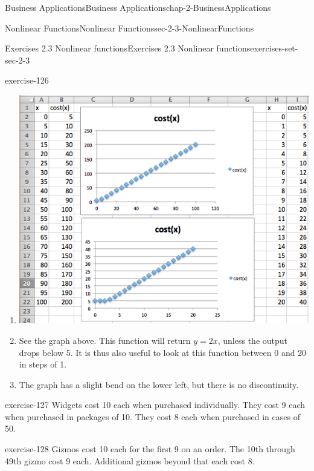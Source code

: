 \documentclass[oneside,10pt,]{book}
\numberwithin{equation}{section}
\begin{document}
\begin{chapterptx}{Business Applications}{}{Business Applications}{}{}{chap-2-BusinessApplications}
\begin{sectionptx}{Nonlinear Functions}{}{Nonlinear Functions}{}{}{sec-2-3-NonlinearFunctions}
\begin{exercises-subsection-numberless}{Exercises 2.3 Nonlinear functions}{}{Exercises 2.3 Nonlinear functions}{}{}{exercises-set-sec-2-3}
\begin{exercisegroup}
\begin{divisionexerciseeg}{11}{}{}{exercise-126}
\begin{enumerate}[label=(\alph*)]
The function is =MAX(2\textasteriskcentered{}A2,5)%
\item\hypertarget{li-245}{}\hypertarget{p-852}{}%
\leavevmode%
\begin{sidebyside}{1}{0}{0}{0}%
\begin{sbspanel}{1}%
\includegraphics[width=1\linewidth]{images/sec2-3-sol11a.png}
\end{sbspanel}%
\end{sidebyside}%
%
\item\hypertarget{li-246}{}\hypertarget{p-853}{}%
See the graph above.  This function will return \(y = 2x\), unless the output drops below 5. It is thus also useful to look at this function between 0 and 20 in steps of 1.%
\item\hypertarget{li-247}{}\hypertarget{p-854}{}%
The graph has a slight bend on the lower left, but there is no discontinuity.%
\end{enumerate}
\end{divisionexerciseeg}%
\begin{divisionexerciseeg}{12}{}{}{exercise-127}%
\hypertarget{p-855}{}%
Widgets cost \textdollar{}10 each when purchased individually.  They cost \textdollar{}9 each when purchased in packages of 10.  They cost \textdollar{}8 each when purchased in cases of 50.%
\end{divisionexerciseeg}%
\begin{divisionexerciseeg}{13}{}{}{exercise-128}%
\hypertarget{p-856}{}%
Gizmos cost \textdollar{}10 each for the first 9 on an order.  The 10th through 49th gizmo cost \textdollar{}9 each.  Additional gizmos beyond that each cost \textdollar{}8.%

\end{divisionexerciseeg}
\end{exercisegroup}
\end{exercises-subsection-numberless}
\end{sectionptx}
\end{chapterptx}
\end{document}
